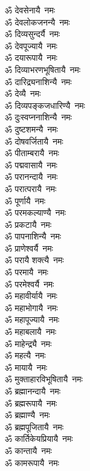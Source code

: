 \begin{flushleft}
\begin{multicols}{2}
ॐ देवसेनायै~नमः\\
ॐ देवलोकजनन्यै~नमः\\
ॐ दिव्यसुन्दर्यै~नमः\\
ॐ देवपूज्यायै~नमः\\
ॐ दयारूपायै~नमः\\
ॐ दिव्याभरणभूषितायै~नमः\\
ॐ दारिद्र्यनाशिन्यै~नमः\\
ॐ देव्यै~नमः\\
ॐ दिव्यपङ्कजधारिण्यै~नमः\\
ॐ दुःस्वप्ननाशिन्यै~नमः\hfill{}\\
ॐ दुष्टशमन्यै~नमः\\
ॐ दोषवर्जितायै~नमः\\
ॐ पीताम्बरायै~नमः\\
ॐ पद्मवासायै~नमः\\
ॐ परानन्दायै~नमः\\
ॐ परात्परायै~नमः\\
ॐ पूर्णायै~नमः\\
ॐ परमकल्याण्यै~नमः\\
ॐ प्रकटायै~नमः\\
ॐ पापनाशिन्यै~नमः\hfill{}\\
ॐ प्राणेश्वर्यै~नमः\\
ॐ परायै शक्त्यै~नमः\\
ॐ परमायै~नमः\\
ॐ परमेश्वर्यै~नमः\\
ॐ महावीर्यायै~नमः\\
ॐ महाभोगायै~नमः\\
ॐ महापूज्यायै~नमः\\
ॐ महाबलायै~नमः\\
ॐ माहेन्द्र्यै~नमः\\
ॐ महत्यै~नमः\hfill{}\\
ॐ मायायै~नमः\\
ॐ मुक्ताहारविभूषितायै~नमः\\
ॐ ब्रह्मानन्दायै~नमः\\
ॐ ब्रह्मरूपायै~नमः\\
ॐ ब्रह्माण्यै~नमः\\
ॐ ब्रह्मपूजितायै~नमः\\
ॐ कार्तिकेयप्रियायै~नमः\\
ॐ कान्तायै~नमः\\
ॐ कामरूपायै~नमः\\

\end{multicols}
\end{flushleft}
